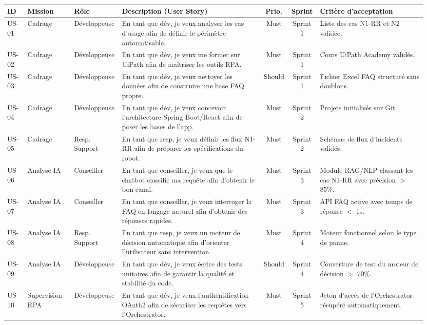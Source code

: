 \begin{table}[htbp]
\centering
\small
\begin{tabular}{|l|p{2cm}|p{2cm}|p{4.5cm}|c|c|p{3.5cm}|}
\hline
\textbf{ID} & \textbf{Mission} & \textbf{Rôle} & \textbf{Description (User Story)} & \textbf{Prio.} & \textbf{Sprint} & \textbf{Critère d'acceptation} \\ \hline
US-01 & Cadrage & Développeuse & En tant que dév, je veux analyser les cas d'usage afin de définir le périmètre automatisable. & Must & Sprint 1 & Liste des cas N1-RR et N2 validée. \\ \hline
US-02 & Cadrage & Développeuse & En tant que dév, je veux me former sur UiPath afin de maîtriser les outils RPA. & Must & Sprint 1 & Cours UiPath Academy validés. \\ \hline
US-03 & Cadrage & Développeuse & En tant que dév, je veux nettoyer les données afin de construire une base FAQ propre. & Should & Sprint 1 & Fichier Excel FAQ structuré sans doublons. \\ \hline
US-04 & Cadrage & Développeuse & En tant que dév, je veux concevoir l'architecture Spring Boot/React afin de poser les bases de l'app. & Must & Sprint 2 & Projets initialisés sur Git. \\ \hline
US-05 & Cadrage & Resp. Support & En tant que resp, je veux définir les flux N1-RR afin de préparer les spécifications du robot. & Must & Sprint 2 & Schémas de flux d'incidents validés. \\ \hline
US-06 & Analyse IA & Conseiller & En tant que conseiller, je veux que le chatbot classifie ma requête afin d'obtenir le bon canal. & Must & Sprint 3 & Module RAG/NLP classant les cas N1-RR avec précision $>$ 85\%. \\ \hline
US-07 & Analyse IA & Conseiller & En tant que conseiller, je veux interroger la FAQ en langage naturel afin d'obtenir des réponses rapides. & Must & Sprint 3 & API FAQ active avec temps de réponse $<$ 1s. \\ \hline
US-08 & Analyse IA & Resp. Support & En tant que resp, je veux un moteur de décision automatique afin d'orienter l'utilisateur sans intervention. & Must & Sprint 4 & Moteur fonctionnel selon le type de panne. \\ \hline
US-09 & Analyse IA & Développeuse & En tant que dév, je veux écrire des tests unitaires afin de garantir la qualité et stabilité du code. & Should & Sprint 4 & Couverture de test du moteur de décision $>$ 70\%. \\ \hline
US-10 & Supervision RPA & Développeuse & En tant que dév, je veux l'authentification OAuth2 afin de sécuriser les requêtes vers l'Orchestrator. & Must & Sprint 5 & Jeton d'accès de l'Orchestrator récupéré automatiquement. \\ \hline

\end{tabular}
\end{table}
